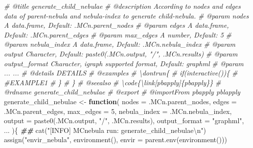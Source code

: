 \documentclass[
]{article}
\newenvironment{Shaded}{\begin{snugshade}}{\end{snugshade}}
\newcommand{\AttributeTok}[1]{\textcolor[rgb]{0.77,0.63,0.00}{#1}}
\newcommand{\CommentTok}[1]{\textcolor[rgb]{0.56,0.35,0.01}{\textit{#1}}}
\newcommand{\ControlFlowTok}[1]{\textcolor[rgb]{0.13,0.29,0.53}{\textbf{#1}}}
\newcommand{\DecValTok}[1]{\textcolor[rgb]{0.00,0.00,0.81}{#1}}
\newcommand{\DocumentationTok}[1]{\textcolor[rgb]{0.56,0.35,0.01}{\textbf{\textit{#1}}}}
\newcommand{\FunctionTok}[1]{\textcolor[rgb]{0.00,0.00,0.00}{#1}}
\newcommand{\NormalTok}[1]{#1}
\newcommand{\OtherTok}[1]{\textcolor[rgb]{0.56,0.35,0.01}{#1}}
\newcommand{\SpecialCharTok}[1]{\textcolor[rgb]{0.00,0.00,0.00}{#1}}
\newcommand{\StringTok}[1]{\textcolor[rgb]{0.31,0.60,0.02}{#1}}
\begin{document}
\begin{Shaded}
\begin{Highlighting}[]
\CommentTok{\#\textquotesingle{} @title generate\_child\_nebulae}
\CommentTok{\#\textquotesingle{} @description According to nodes and edges data of parent{-}nebula and nebula{-}index to generate child{-}nebula.}
\CommentTok{\#\textquotesingle{} @param nodes A data.frame, Default: .MCn.parent\_nodes}
\CommentTok{\#\textquotesingle{} @param edges A data.frame, Default: .MCn.parent\_edges}
\CommentTok{\#\textquotesingle{} @param max\_edges A number, Default: 5}
\CommentTok{\#\textquotesingle{} @param nebula\_index A data.frame, Default: .MCn.nebula\_index}
\CommentTok{\#\textquotesingle{} @param output Character, Default: paste0(.MCn.output, "/", .MCn.results)}
\CommentTok{\#\textquotesingle{} @param output\_format Character, \textquotesingle{}igraph\textquotesingle{} supported format, Default: \textquotesingle{}graphml\textquotesingle{}}
\CommentTok{\#\textquotesingle{} @param ... ...}
\CommentTok{\#\textquotesingle{} @details DETAILS}
\CommentTok{\#\textquotesingle{} @examples }
\CommentTok{\#\textquotesingle{} \textbackslash{}dontrun\{}
\CommentTok{\#\textquotesingle{} if(interactive())\{}
\CommentTok{\#\textquotesingle{}  \#EXAMPLE1}
\CommentTok{\#\textquotesingle{}  \}}
\CommentTok{\#\textquotesingle{} \}}
\CommentTok{\#\textquotesingle{} @seealso }
\CommentTok{\#\textquotesingle{}  \textbackslash{}code\{\textbackslash{}link[pbapply]\{pbapply\}\}}
\CommentTok{\#\textquotesingle{} @rdname generate\_child\_nebulae}
\CommentTok{\#\textquotesingle{} @export }
\CommentTok{\#\textquotesingle{} @importFrom pbapply pblapply}
\NormalTok{generate\_child\_nebulae }\OtherTok{\textless{}{-}}
  \ControlFlowTok{function}\NormalTok{(}
           \AttributeTok{nodes =}\NormalTok{ .MCn.parent\_nodes,}
           \AttributeTok{edges =}\NormalTok{ .MCn.parent\_edges,}
           \AttributeTok{max\_edges =} \DecValTok{5}\NormalTok{,}
           \AttributeTok{nebula\_index =}\NormalTok{ .MCn.nebula\_index,}
           \AttributeTok{output =} \FunctionTok{paste0}\NormalTok{(.MCn.output, }\StringTok{"/"}\NormalTok{, .MCn.results),}
           \AttributeTok{output\_format =} \StringTok{"graphml"}\NormalTok{,}
\NormalTok{           ...}
\NormalTok{           )\{}
    \DocumentationTok{\#\#}
    \FunctionTok{cat}\NormalTok{(}\StringTok{"[INFO] MCnebula run: generate\_child\_nebulae}\SpecialCharTok{\textbackslash{}n}\StringTok{"}\NormalTok{)}
    \FunctionTok{assign}\NormalTok{(}\StringTok{"envir\_nebula"}\NormalTok{, }\FunctionTok{environment}\NormalTok{(), }\AttributeTok{envir =} \FunctionTok{parent.env}\NormalTok{(}\FunctionTok{environment}\NormalTok{()))}

\end{Highlighting}
\end{Shaded}
\end{document}
